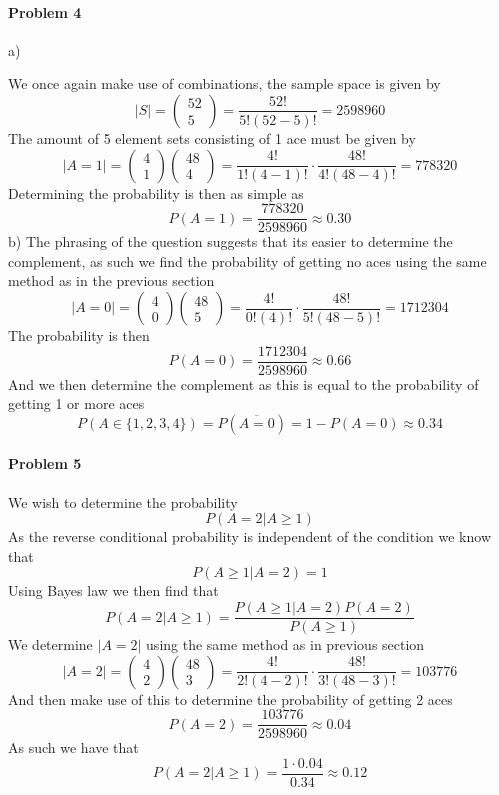 \paragraph{Problem 4}
a)

We once again make use of combinations, the sample space is given by
\[
    |S|=\begin{pmatrix}52\\5\end{pmatrix}=\frac{52!}{5!(52-5)!}=2598960
\]
The amount of 5 element sets consisting of 1 ace must be given by
\[
    |A=1|=\begin{pmatrix}4\\1\end{pmatrix}\begin{pmatrix}48\\4\end{pmatrix}=\frac{4!}{1!(4-1)!}\cdot\frac{48!}{4!(48-4)!}=778320
\]
Determining the probability is then as simple as
\[
    P(A=1)=\frac{778320}{2598960}\approx 0.30
\]
b) The phrasing of the question suggests that its easier to determine the complement, as such we find the probability of getting no aces using the same method as in the previous section
\[
    |A=0|=\begin{pmatrix}4\\0\end{pmatrix}\begin{pmatrix}48\\5\end{pmatrix}=\frac{4!}{0!(4)!}\cdot\frac{48!}{5!(48-5)!}=1712304
\]
The probability is then
\[
    P(A=0)=\frac{1712304}{2598960}\approx 0.66
\]
And we then determine the complement as this is equal to the probability of getting 1 or more aces
\[
    P(A\in\{1,2,3,4\})=P(\overline{A=0})=1-P(A=0)\approx 0.34
\]
\paragraph{Problem 5}
We wish to determine the probability
\[
    P(A=2|A\geq 1)
\]
As the reverse conditional probability is independent of the condition we know that
\[
    P(A\geq 1|A=2)=1
\]
Using Bayes law we then find that
\[
    P(A=2|A\geq 1)=\frac{P(A\geq 1|A=2)P(A=2)}{P(A\geq 1)}
\]
We determine $|A=2|$ using the same method as in previous section
\[
    |A=2|=\begin{pmatrix}4\\2\end{pmatrix}\begin{pmatrix}48\\3\end{pmatrix}=\frac{4!}{2!(4-2)!}\cdot\frac{48!}{3!(48-3)!}=103776
\]
And then make use of this to determine the probability of getting 2 aces
\[
    P(A=2)=\frac{103776}{2598960}\approx 0.04
\]
As such we have that
\[
    P(A=2|A\geq 1)=\frac{1\cdot 0.04}{0.34}\approx 0.12
\]
